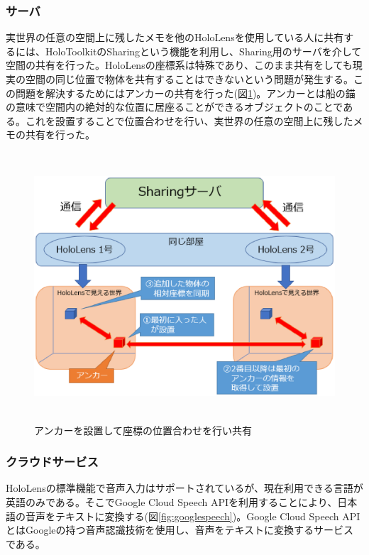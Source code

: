 \documentclass[11pt,a4j, titlepage]{jarticle} %
\begin{document}
\subsubsection{サーバ}
実世界の任意の空間上に残したメモを他のHoloLensを使用している人に共有するには、HoloToolkitのSharing\cite{sharing}という機能を利用し、Sharing用のサーバを介して空間の共有を行った。HoloLensの座標系は特殊であり、このまま共有をしても現実の空間の同じ位置で物体を共有することはできないという問題が発生する。この問題を解決するためにはアンカーの共有を行った(図\ref{fig:sharing})。アンカーとは船の錨の意味で空間内の絶対的な位置に居座ることができるオブジェクトのことである。これを設置することで位置合わせを行い、実世界の任意の空間上に残したメモの共有を行った。

\begin{figure}[H]
  \begin{center}
    \includegraphics[clip,height=10.0cm,width=14.0cm]{./sharing.eps}
    \caption{アンカーを設置して座標の位置合わせを行い共有}
    \label{fig:sharing}
  \end{center}
\end{figure}

\subsubsection{クラウドサービス}
HoloLensの標準機能で音声入力はサポートされているが、現在利用できる言語が英語のみである\cite{emuniwa}。そこでGoogle Cloud Speech API\cite{google_speech}を利用することにより、日本語の音声をテキストに変換する(図\ref{fig:googlespeech})。Google Cloud Speech APIとはGoogleの持つ音声認識技術を使用し、音声をテキストに変換するサービスである。
\end{document}
